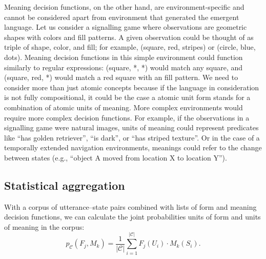 Meaning decision functions, on the other hand, are environment-specific and cannot be considered apart from environment that generated the emergent language.
Let us consider a signalling game where observations are geometric shapes with colors and fill patterns.
A given observation could be thought of as triple of shape, color, and fill; for example, (square, red, stripes) or (circle, blue, dots).
Meaning decision functions in this simple environment could function similarly to regular expressions: (square, *, *) would match any square, and (square, red, *) would match a red square with an fill pattern.
We need to consider more than just atomic concepts because if the language in consideration is not fully compositional, it could be the case a atomic unit form stands for a combination of atomic units of meaning.
More complex environments would require more complex decision functions.
For example, if the observations in a signalling game were natural images, units of meaning could represent predicates like ``has golden retriever'', ``is dark'', or ``has striped texture''.
Or in the case of a temporally extended navigation environments, meanings could refer to the change between states (e.g., ``object A moved from location X to location Y'').



\subsection{Statistical aggregation}

With a corpus of utterance--state pairs combined with lists of form and meaning decision functions, we can calculate the joint probabilities units of form and units of meaning in the corpus:
\begin{equation} \label{eq:morph-joint}
  p_{\mathcal C}(F_j, M_k) = \frac1{|\mathcal C|} \sum^{|\mathcal C|}_{i=1} F_j(U_i) \cdot M_k(S_i)
  .
\end{equation}



